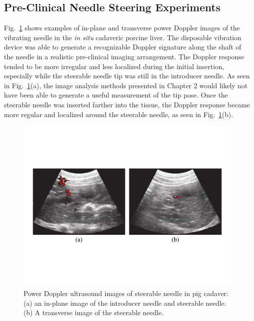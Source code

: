 \subsection{Pre-Clinical Needle Steering Experiments}
Fig.~\ref{fig:CadaverDoppler} shows examples of in-plane and transverse power Doppler images of the vibrating needle in the \textit{in situ} cadaveric porcine liver. The disposable vibration device was able to generate a recognizable Doppler signature along the shaft of the needle in a realistic pre-clinical imaging arrangement. The Doppler response tended to be more irregular and less localized during the initial insertion, especially while the steerable needle tip was still in the introducer needle. As seen in Fig.~\ref{fig:CadaverDoppler}(a), the image analysis methods presented in Chapter 2 would likely not have been able to generate a useful measurement of the tip pose. Once the steerable needle was inserted farther into the tissue, the Doppler response became more regular and localized around the steerable needle, as seen in Fig.~\ref{fig:CadaverDoppler}(b). 

\begin{figure}[!t]
\centering
\includegraphics[width = \columnwidth]{./Images/Chapter5/CadaverDoppler/CadaverDoppler.pdf}%
\caption[Power Doppler ultrasound images of steerable needle in pig cadaver]{Power Doppler ultrasound images of steerable needle in pig cadaver: (a) an in-plane image of the introducer needle and steerable needle. (b) A transverse image of the steerable needle.  }
\label{fig:CadaverDoppler}
\end{figure}  

